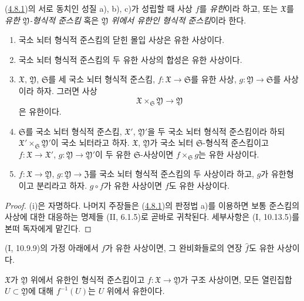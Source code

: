 \begin{definition}[4.8.2]
\label{III.4.8.2-fr}
(\hyperref[III.4.8.1-fr]{4.8.1})의 서로 동치인 성질 a), b), c)가
성립할 때 사상 $f$를 \emph{유한}이라 하고, 또는
$\mathfrak X$를 \emph{유한 $\mathfrak Y$-형식적 준스킴} 혹은
\emph{$\mathfrak Y$ 위에서 유한인 형식적 준스킴}이라 한다.
\end{definition}

\begin{proposition}[4.8.3]
\label{III.4.8.3-fr}
\begin{enumerate}
\item[(i)]
국소 뇌터 형식적 준스킴의 닫힌 몰입 사상은 유한 사상이다.
\item[(ii)]
국소 뇌터 형식적 준스킴의 두 유한 사상의 합성은 유한 사상이다.
\item[(iii)]
$\mathfrak X$, $\mathfrak Y$, $\mathfrak S$를 세 국소 뇌터
형식적 준스킴, $f:\mathfrak X\to\mathfrak S$를 유한 사상,
$g:\mathfrak Y\to\mathfrak S$를 사상이라 하자. 그러면 사상
\[
\mathfrak X\times_{\mathfrak S}\mathfrak Y\longrightarrow\mathfrak Y
\]
은 유한이다.
\item[(iv)]
$\mathfrak S$를 국소 뇌터 형식적 준스킴,
$\mathfrak X'$, $\mathfrak Y'$을 두 국소 뇌터 형식적 준스킴이라
하되
$\mathfrak X'\times_{\mathfrak S}\mathfrak Y'$이 국소 뇌터라고
하자. $\mathfrak X$, $\mathfrak Y$가 국소 뇌터
$\mathfrak S$-형식적 준스킴이고
$f:\mathfrak X\to\mathfrak X'$,
$g:\mathfrak Y\to\mathfrak Y'$이 두 유한 $\mathfrak S$-사상이면
$f\times_{\mathfrak S}g$는 유한 사상이다.
\item[(v)]
$f:\mathfrak X\to\mathfrak Y$,
$g:\mathfrak Y\to\mathfrak Z$를 국소 뇌터 형식적 준스킴의 두
사상이라 하고, $g$가 유한형이고 분리라고 하자. $g\circ f$가
유한 사상이면 $f$도 유한 사상이다.
\end{enumerate}
\end{proposition}

\begin{proof}
(i)은 자명하다. 나머지 주장들은
(\hyperref[III.4.8.1-fr]{4.8.1})의 판정법 a)를 이용하면 보통
준스킴의 사상에 대한 대응하는 명제들 (II, 6.1.5)로 곧바로
귀착된다. 세부사항은 (I, 10.13.5)를 본떠 독자에게 맡긴다.
\end{proof}

\begin{corollary}[4.8.4]
\label{III.4.8.4-fr}
(I, 10.9.9)의 가정 아래에서 $f$가 유한 사상이면, 그 완비화들로의
연장 $\widehat f$도 유한 사상이다.
\end{corollary}

\begin{corollary}[4.8.5]
\label{III.4.8.5-fr}
$\mathfrak X$가 $\mathfrak Y$ 위에서 유한인 형식적 준스킴이고
$f:\mathfrak X\to\mathfrak Y$가 구조 사상이면, 모든 열린집합
$U\subset\mathfrak Y$에 대해 $f^{-1}(U)$는 $U$ 위에서 유한이다.
\end{corollary}

